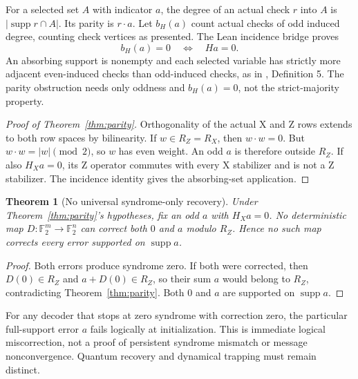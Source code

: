 \documentclass[11pt]{article}
\newtheorem{theorem}{Theorem}
\newcommand{\F}{\mathbb F_2}
\newcommand{\supp}{\operatorname{supp}}
\begin{document}
For a selected set $A$ with indicator $a$, the degree of an actual check $r$ into $A$ is $|\supp r\cap A|$. Its parity is $r\cdot a$. Let $b_H(a)$ count actual checks of odd induced degree, counting check vertices as presented. The Lean incidence bridge proves
\[
 b_H(a)=0\quad\Longleftrightarrow\quad Ha=0.
\]
An absorbing support is nonempty and each selected variable has strictly more adjacent even-induced checks than odd-induced checks, as in \cite{mpk}, Definition 5. The parity obstruction needs only oddness and $b_H(a)=0$, not the strict-majority property.

\begin{proof}[Proof of Theorem~\ref{thm:parity}]
Orthogonality of the actual X and Z rows extends to both row spaces by bilinearity. If $w\in R_Z=R_X$, then $w\cdot w=0$. But $w\cdot w=|w|\pmod 2$, so $w$ has even weight. An odd $a$ is therefore outside $R_Z$. If also $H_Xa=0$, its Z operator commutes with every X stabilizer and is not a Z stabilizer. The incidence identity gives the absorbing-set application.
\end{proof}

\begin{theorem}[No universal syndrome-only recovery]\label{thm:decoder}
Under Theorem~\ref{thm:parity}'s hypotheses, fix an odd $a$ with $H_Xa=0$. No deterministic map $D:\F^m\to\F^n$ can correct both $0$ and $a$ modulo $R_Z$. Hence no such map corrects every error supported on $\supp a$.
\end{theorem}
\begin{proof}
Both errors produce syndrome zero. If both were corrected, then $D(0)\in R_Z$ and $a+D(0)\in R_Z$, so their sum $a$ would belong to $R_Z$, contradicting Theorem~\ref{thm:parity}. Both $0$ and $a$ are supported on $\supp a$.
\end{proof}
For any decoder that stops at zero syndrome with correction zero, the particular full-support error $a$ fails logically at initialization. This is immediate logical miscorrection, not a proof of persistent syndrome mismatch or message nonconvergence. Quantum recovery and dynamical trapping must remain distinct.
\end{document}
